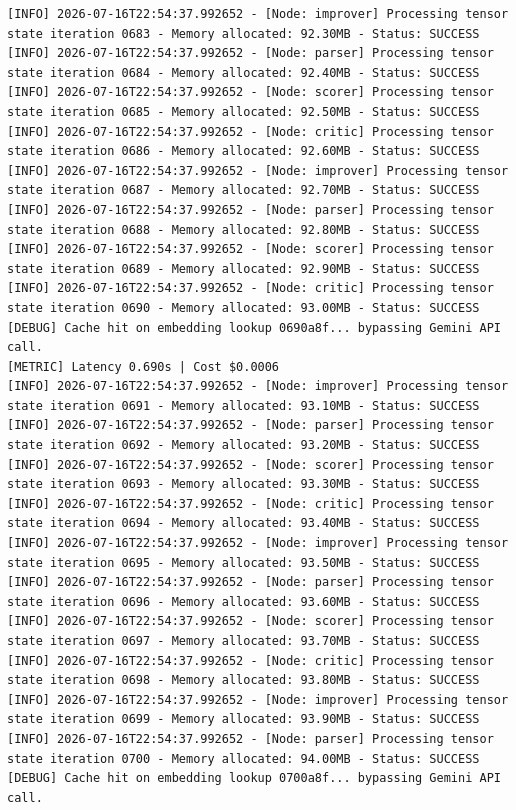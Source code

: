 \documentclass[10pt,journal,compsoc]{IEEEtran}
\begin{document}
\begin{verbatim}
[INFO] 2026-07-16T22:54:37.992652 - [Node: improver] Processing tensor state iteration 0683 - Memory allocated: 92.30MB - Status: SUCCESS
[INFO] 2026-07-16T22:54:37.992652 - [Node: parser] Processing tensor state iteration 0684 - Memory allocated: 92.40MB - Status: SUCCESS
[INFO] 2026-07-16T22:54:37.992652 - [Node: scorer] Processing tensor state iteration 0685 - Memory allocated: 92.50MB - Status: SUCCESS
[INFO] 2026-07-16T22:54:37.992652 - [Node: critic] Processing tensor state iteration 0686 - Memory allocated: 92.60MB - Status: SUCCESS
[INFO] 2026-07-16T22:54:37.992652 - [Node: improver] Processing tensor state iteration 0687 - Memory allocated: 92.70MB - Status: SUCCESS
[INFO] 2026-07-16T22:54:37.992652 - [Node: parser] Processing tensor state iteration 0688 - Memory allocated: 92.80MB - Status: SUCCESS
[INFO] 2026-07-16T22:54:37.992652 - [Node: scorer] Processing tensor state iteration 0689 - Memory allocated: 92.90MB - Status: SUCCESS
[INFO] 2026-07-16T22:54:37.992652 - [Node: critic] Processing tensor state iteration 0690 - Memory allocated: 93.00MB - Status: SUCCESS
[DEBUG] Cache hit on embedding lookup 0690a8f... bypassing Gemini API call.
[METRIC] Latency 0.690s | Cost $0.0006
[INFO] 2026-07-16T22:54:37.992652 - [Node: improver] Processing tensor state iteration 0691 - Memory allocated: 93.10MB - Status: SUCCESS
[INFO] 2026-07-16T22:54:37.992652 - [Node: parser] Processing tensor state iteration 0692 - Memory allocated: 93.20MB - Status: SUCCESS
[INFO] 2026-07-16T22:54:37.992652 - [Node: scorer] Processing tensor state iteration 0693 - Memory allocated: 93.30MB - Status: SUCCESS
[INFO] 2026-07-16T22:54:37.992652 - [Node: critic] Processing tensor state iteration 0694 - Memory allocated: 93.40MB - Status: SUCCESS
[INFO] 2026-07-16T22:54:37.992652 - [Node: improver] Processing tensor state iteration 0695 - Memory allocated: 93.50MB - Status: SUCCESS
[INFO] 2026-07-16T22:54:37.992652 - [Node: parser] Processing tensor state iteration 0696 - Memory allocated: 93.60MB - Status: SUCCESS
[INFO] 2026-07-16T22:54:37.992652 - [Node: scorer] Processing tensor state iteration 0697 - Memory allocated: 93.70MB - Status: SUCCESS
[INFO] 2026-07-16T22:54:37.992652 - [Node: critic] Processing tensor state iteration 0698 - Memory allocated: 93.80MB - Status: SUCCESS
[INFO] 2026-07-16T22:54:37.992652 - [Node: improver] Processing tensor state iteration 0699 - Memory allocated: 93.90MB - Status: SUCCESS
[INFO] 2026-07-16T22:54:37.992652 - [Node: parser] Processing tensor state iteration 0700 - Memory allocated: 94.00MB - Status: SUCCESS
[DEBUG] Cache hit on embedding lookup 0700a8f... bypassing Gemini API call.

\end{verbatim}
\end{document}
